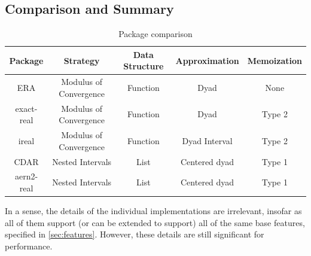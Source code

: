 \subsection{Comparison and Summary}

\begin{table}[h!]
    \centering
    \begin{tabular}{ |c|c|c|c|c| }
        \hline
        Package    & Strategy & Data Structure & Approximation & Memoization  \\
        \hline
        ERA        & Modulus of Convergence & Function & Dyad & None \\
        exact-real & Modulus of Convergence & Function & Dyad & Type 2 \\
        ireal      & Modulus of Convergence & Function & Dyad Interval & Type 2 \\
        CDAR       & Nested Intervals & List & Centered dyad & Type 1 \\
        aern2-real & Nested Intervals & List & Centered dyad & Type 1 \\
        \hline
    \end{tabular}
    \caption{Package comparison}
    \label{tab:comparison}
\end{table}

In a sense, the details of the individual implementations are irrelevant, insofar as all of them support (or can be extended to support) all of the same base features, specified in \cref{sec:features}. However, these details are still significant for performance.


